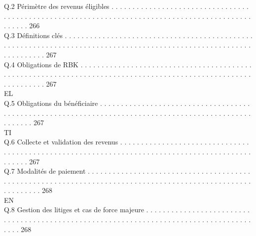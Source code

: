 Q.2     Périmètre des revenus éligibles . . . . . . . . . . . . . . . . . . . . . . . . . . . . . . . . . . . . . . . . . . . . . . . . . . . . . . . . . . . . . . . . . . . . . . . . . . . . . . . . . . . . . . . . . . . . . . . . . . 266\\
Q.3     Définitions clés . . . . . . . . . . . . . . . . . . . . . . . . . . . . . . . . . . . . . . . . . . . . . . . . . . . . . . . . . . . . . . . . . . . . . . . . . . . . . . . . . . . . . . . . . . . . . . . . . . . . . . . . . . . . . . . . . . 267\\
Q.4     Obligations de RBK . . . . . . . . . . . . . . . . . . . . . . . . . . . . . . . . . . . . . . . . . . . . . . . . . . . . . . . . . . . . . . . . . . . . . . . . . . . . . . . . . . . . . . . . . . . . . . . . . . . . . . . . . . . . . . 267\\
\vspace{0.5em}
\vspace{0.5em}
\vspace{0.5em}
\vspace{0.5em}
EL\\
Q.5     Obligations du bénéficiaire . . . . . . . . . . . . . . . . . . . . . . . . . . . . . . . . . . . . . . . . . . . . . . . . . . . . . . . . . . . . . . . . . . . . . . . . . . . . . . . . . . . . . . . . . . . . . . . . . . . . . . 267\\
\vspace{0.5em}
\vspace{0.5em}
\vspace{0.5em}
\vspace{0.5em}
TI\\
Q.6     Collecte et validation des revenus . . . . . . . . . . . . . . . . . . . . . . . . . . . . . . . . . . . . . . . . . . . . . . . . . . . . . . . . . . . . . . . . . . . . . . . . . . . . . . . . . . . . . . . . . . . . . . . . 267\\
Q.7     Modalités de paiement . . . . . . . . . . . . . . . . . . . . . . . . . . . . . . . . . . . . . . . . . . . . . . . . . . . . . . . . . . . . . . . . . . . . . . . . . . . . . . . . . . . . . . . . . . . . . . . . . . . . . . . . . . . 268\\
\vspace{0.5em}
\vspace{0.5em}
\vspace{0.5em}
\vspace{0.5em}
EN\\
Q.8     Gestion des litiges et cas de force majeure . . . . . . . . . . . . . . . . . . . . . . . . . . . . . . . . . . . . . . . . . . . . . . . . . . . . . . . . . . . . . . . . . . . . . . . . . . . . . . . . . . . . . . . . 268\\
